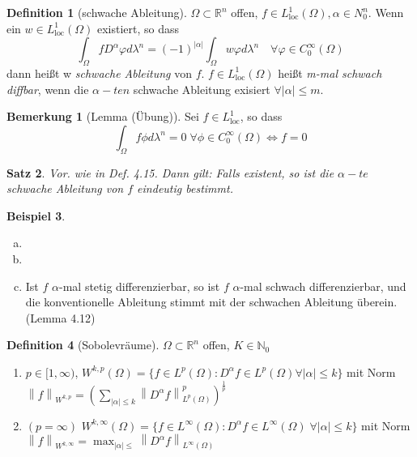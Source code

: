 \documentclass[ngerman]{report}
\theoremstyle{plain}%
\newtheorem{thm}{Satz}[chapter]
\theoremstyle{definition}%
\newtheorem{definition}[thm]{Definition}
\newtheorem{bsp}[thm]{Beispiel}
\theoremstyle{myStyle}
\newtheorem*{bem*}{Bemerkung}
\newcommand{\R}{\mathbb{R}}
\newcommand{\N}{\mathbb{N}}
\newcommand{\norm}[1]{\left \|#1\right\| }
\newcommand{\aq}{\Leftrightarrow} %
\newcommand{\set}[1]{\{#1\}} %
\begin{document}
	\begin{definition}[schwache Ableitung]
		$\Omega \subset \R^n$ offen, $f\in L^1_{\text{loc}}(\Omega), \alpha \in N^n_0$. Wenn ein 
		$w \in L^1_{\text{loc}}(\Omega)$ existiert, so dass 
			$$\int_\Omega f D^\alpha \varphi d\lambda^n = (-1)^|\alpha| \int_\Omega w \varphi d\lambda^n 
			\quad \forall \varphi \in C_0^\infty(\Omega)$$
			dann heißt w \textit{schwache Ableitung} von $f$. $f \in L^1_{\text{loc}}(\Omega)$ heißt \textit{m-mal schwach diffbar}, wenn die $\alpha-ten$ schwache Ableitung exisiert $\forall |\alpha| \leq m$. 
	\end{definition}
	
	\begin{bem*}[Lemma (Übung)]
		Sei $f\in L^1_{\text{loc}}$, so dass 
			$$\int_\Omega f \phi d\lambda^n = 0 \; \forall \phi \in C^\infty_0(\Omega) \aq f = 0$$
	\end{bem*}

	\begin{thm}
		Vor. wie in Def. 4.15. Dann gilt: Falls existent, so ist die $\alpha-te$ schwache Ableitung von $f$ eindeutig bestimmt. 
	\end{thm}

	\begin{bsp}
		\begin{enumerate}[a)]
			\item
			\item
			\item Ist $f$ $\alpha$-mal stetig differenzierbar, so ist $f$ $\alpha$-mal schwach differenzierbar, und die konventionelle Ableitung stimmt mit der schwachen Ableitung überein. (Lemma 4.12)
		\end{enumerate}
	\end{bsp}

	\begin{definition}[Sobolevräume]
		$\Omega \subset \R^n$ offen, $K\in\N_0$	
		\begin{enumerate}
			\item $p\in [1,\infty)$, $W^{k,p}(\Omega) = \set{f\in L^p(\Omega): D^\alpha f\in L^p(\Omega) \forall |\alpha| \leq k}$ mit Norm $\norm{f}_{W^{k,p}} = (\sum_{|\alpha| \leq k} \norm{D^\alpha f}^p_{L^p(\Omega)})^{\frac{1}{p}}$
		\item $(p = \infty)$ $W^{k,\infty}(\Omega) = \set{f\in L^\infty(\Omega): D^\alpha f \in L^\infty(\Omega) \; \forall |\alpha| \leq k}$ mit Norm $\norm{f}_{W^{k,\infty}} = \max_{|\alpha| \leq} \norm{D^\alpha f}_{L^\infty(\Omega)}$
		\end{enumerate}
	\end{definition}
\end{document}
